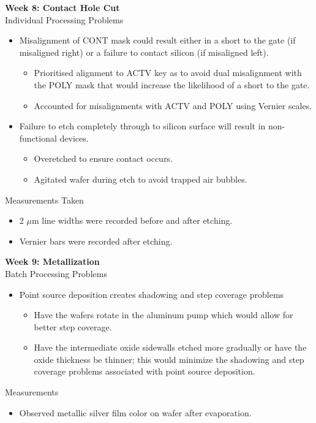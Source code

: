 \documentclass{article}
\begin{document}
\textbf{Week 8: Contact Hole Cut} \\
Individual Processing Problems
\begin{itemize}
\item Misalignment of CONT mask could result either in a short to the gate (if misaligned right) or a failure to contact silicon (if misaligned left).
	\begin{itemize}
	\item Prioritised alignment to ACTV key as to avoid dual misalignment with the POLY mask that would increase the likelihood of a short to the gate.
	\item Accounted for misalignments with ACTV and POLY using Vernier scales.
	\end{itemize}
\item Failure to etch completely through to silicon surface will result in non-functional devices.
	\begin{itemize}
	\item Overetched to ensure contact occurs.
	\item Agitated wafer during etch to avoid trapped air bubbles.
	\end{itemize}
\end{itemize}
Measurements Taken
\begin{itemize}
\item 2 $\mu$m line widths were recorded before and after etching.
\item Vernier bars were recorded after etching.
\end{itemize}

\textbf{Week 9: Metallization} \\
Batch Processing Problems
\begin{itemize}
\item Point source deposition creates shadowing and step coverage problems
	\begin{itemize}
	\item Have the wafers rotate in the aluminum pump which would allow for better step coverage.
	\item Have the intermediate oxide sidewalls etched more gradually or have the oxide thickness be thinner; this would minimize the shadowing and step coverage problems associated with point source deposition.
	\end{itemize}
\end{itemize}
Measurements
\begin{itemize}
\item Observed metallic silver film color on wafer after evaporation.
\end{itemize}
\end{document}
